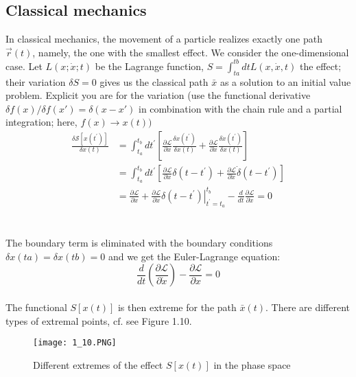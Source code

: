 \subsection{Classical mechanics}
In classical mechanics, the movement of a particle realizes exactly one path $\vec{r} (t)$, namely, the one with the smallest effect. We consider the one-dimensional case. Let $L (x; \dot{x}; t)$ be the Lagrange function, $S=\int_{ta}^{tb}dtL(x,\dot{x}, t)$ the effect; their variation $\delta S = 0$ gives us the classical path $\bar{x}$ as a solution to an initial value problem. Explicit you are for the variation (use the functional derivative $\delta f (x)/\delta f(x') = \delta(x-x')$
in combination with the chain rule and a partial integration; here,
$f (x)\to x (t))$
\\
\begin{equation}
\begin{aligned} \frac{\delta \mathcal{S}\left[x\left(t^{\prime}\right)\right]}{\delta x(t)} &=\int_{t_{a}}^{t_{b}} d t^{\prime}\left[\frac{\partial \mathcal{L}}{\partial x} \frac{\delta x\left(t^{\prime}\right)}{\delta x(t)}+\frac{\partial \mathcal{L}}{\partial \dot{x}} \frac{\delta \dot{x}\left(t^{\prime}\right)}{\delta x(t)}\right] \\ &=\int_{t_{a}}^{t_{b}} d t^{\prime}\left[\frac{\partial \mathcal{L}}{\partial x} \delta\left(t-t^{\prime}\right)+\frac{\partial \mathcal{L}}{\partial \dot{x}} \dot{\delta}\left(t-t^{\prime}\right)\right] \\ &=\frac{\partial \mathcal{L}}{\partial x}+\left.\frac{\partial \mathcal{L}}{\partial \dot{x}} \delta\left(t-t^{\prime}\right)\right|_{t^{\prime}=t_{a}} ^{t_{b}}-\frac{d}{d t} \frac{\partial \mathcal{L}}{\partial \dot{x}}=0 \end{aligned}
\end{equation}\\
\\
The boundary term is eliminated with the boundary conditions $\delta x (ta) =\delta x (tb) = 0$
and we get the Euler-Lagrange equation:
\\
\begin{equation}
\frac{d}{d t}\left(\frac{\partial \mathcal{L}}{\partial \dot{x}}\right)-\frac{\partial \mathcal{L}}{\partial x}=0
\end{equation}
\\
The functional $S [x (t)]$ is then extreme for the path $\bar{x} (t)$. There are
different types of extremal points, cf. see Figure 1.10.
\begin{figure}[ht]
    \centering
    \texttt{[image: 1\_10.PNG]}
    \caption{Different extremes of the effect $S[x(t)]$ in the phase space}
    \label{fig:1.10}
\end{figure}

